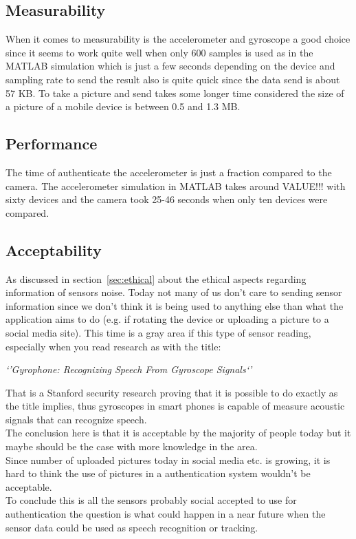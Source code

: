 \subsection*{Measurability}
When it comes to measurability is the accelerometer and gyroscope a good choice since it seems to work quite well when only 600 samples is used as in the MATLAB simulation which is just a few seconds depending on the device and sampling rate to send the result also is quite quick since the data send is about 57 KB. To take a picture and send takes some longer time considered the size of a picture of a mobile device is between 0.5 and 1.3 MB. 

\subsection*{Performance}
The time of authenticate the accelerometer is just a fraction compared to the camera. The accelerometer simulation in MATLAB takes around VALUE!!! with sixty devices and the camera took 25-46 seconds when only ten devices were compared.

\subsection*{Acceptability}
As discussed in section~\ref{sec:ethical} about the ethical aspects regarding information of sensors noise. Today not many of us don't care to sending sensor information since we don't think it is being used to anything else than what the application aims to do (e.g. if rotating the device or uploading a picture to a social media site). This time is a gray area if this type of sensor reading, especially when you read research as with the title:
\begin{center}
\textit{`'Gyrophone: Recognizing Speech From Gyroscope Signals`'}
\end{center}
That is a Stanford security research proving that it is possible to do exactly as the title implies, thus gyroscopes in smart phones is capable of measure acoustic signals that can recognize speech.~\cite[]{stanGyro}\\
The conclusion here is that it is acceptable by the majority of people today but it maybe should be the case with more knowledge in the area.\\Since number of uploaded pictures today in social media etc. is growing, it is hard to think the use of pictures in a authentication system wouldn't be acceptable. \\
To conclude this is all the sensors probably social accepted to use for authentication the question is what could happen in a near future when the sensor data could be used as speech recognition or tracking.


